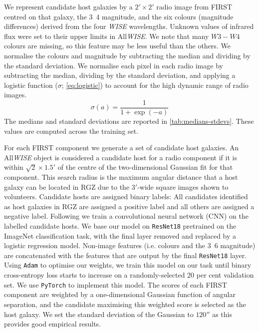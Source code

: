 We represent candidate host galaxies by a $2' \times 2'$ radio image from FIRST centred on that galaxy, the \unit{3.4}{\micro\meter} magnitude, and the six colours (magnitude differences) derived from the four \emph{WISE} wavelengths. Unknown values of infrared flux were set to their upper limits in All\emph{WISE}. We note
that many $W3-W4$ colours are missing, so this feature may be less useful than
the others. We normalise the colours and magnitude by subtracting the median and
dividing by the standard deviation. We normalise each
pixel in each radio image by subtracting the median, dividing by the standard
deviation, and applying a logistic function ($\sigma$;
\autoref{eq:logistic}) to account for the high dynamic range of radio
images.
\begin{equation}
  \sigma(a) = \frac{1}{1 + \exp(-a)}
  \label{eq:logistic}
\end{equation}
The medians and standard deviations are reported in \autoref{tab:medians-stdevs}. These values are computed across the training set.

For each FIRST component we generate a set of candidate host galaxies.
An All\emph{WISE} object is considered a candidate host for a radio
component if it is within $\sqrt{2} \times 1.5'$ of the centre of the two-dimensional
Gaussian fit for that component. This search radius is the maximum
angular distance that a host galaxy can be located in RGZ due to the
$3'$-wide square images shown to volunteers. Candidate hosts are
assigned binary labels: All candidates identified as host galaxies in
RGZ are assigned a positive label and all others are assigned a
negative label. Following \citet{alger18radio} we train a convolutional neural
network (CNN) on the labelled candidate hosts. We
base our model on \texttt{ResNet18} \citep{he2016resnet} pretrained on the
ImageNet classification task, with the final layer removed and replaced
by a logistic regression model. Non-image features (i.e. colours and the
\unit{3.6}{\micro\meter} magnitude) are concatenated with the features
that are output by the final \texttt{ResNet18} layer. Using \texttt{Adam}
\citep{kingma14adam} to optimise our weights, we train this model on our
task until binary cross-entropy loss starts to increase on a
randomly-selected 20 per cent validation set. We use \texttt{PyTorch}
\citep{paszke2017pytorch} to implement this model. The scores of each FIRST
component are weighted by a one-dimensional Gaussian function of angular separation, and the
candidate maximising this weighted score is selected as the host galaxy. We
set the standard deviation of the Gaussian to $120''$ as this provides good
empirical results.

